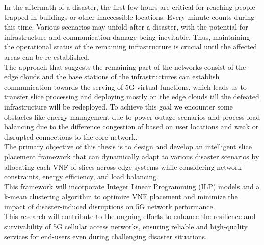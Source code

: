In the aftermath of a disaster, the first few hours are critical for reaching people trapped in buildings or other inaccessible locations. Every minute counts during this time. Various scenarios may unfold after a disaster, with the potential for infrastructure and communication damage being inevitable. Thus, maintaining the operational status of the remaining infrastructure is crucial until the affected areas can be re-established.
\\ 
The approach that suggests the remaining part of the networks consist of the edge clouds and the base stations of the infrastructures can establish communication towards the serving of 5G virtual functions, which leads us to transfer slice processing and deploying mostly on the edge clouds till the defeated infrastructure will be redeployed.  To achieve this goal we encounter some obstacles like energy management due to power outage scenarios and process load balancing due to the difference congestion of based on user locations and weak or disrupted connections to the core network. 
\\
The primary objective of this thesis is to design and develop an intelligent slice placement framework that can dynamically adapt to various disaster scenarios by allocating each VNF of slices across edge systems while considering network constraints, energy efficiency, and load balancing. \\ This framework will incorporate Integer Linear Programming (ILP) models and a k-mean clustering algorithm to optimize VNF placement and minimize the impact of disaster-induced disruptions on 5G network performance.
\\
This research will contribute to the ongoing efforts to enhance the resilience and survivability of 5G cellular access networks, ensuring reliable and high-quality services for end-users even during challenging disaster situations.


